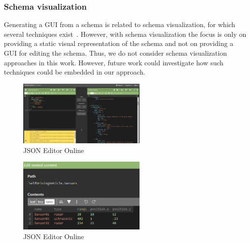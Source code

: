 \subsubsection{Schema visualization}\label{subsubsec:schema-visualization}
Generating a GUI from a schema is related to schema visualization, for which several techniques exist~\cite{Frasincar2006, SILVA201928, 10.1145/1317353.1317362, 1173142}.
However, with schema visualization the focus is only on providing a static visual representation of the schema
and not on providing a GUI for editing the schema.
Thus, we do not consider schema visualization approaches in this work.
However, future work could investigate how such techniques could be embedded in our approach.

\begin{figure}[htb]
    \centering
    \includegraphics[width=2.5in]{figures/jsoneditoronline}
    \caption{JSON Editor Online}
    \label{fig:jsoneditoronline}
\end{figure}
\begin{figure}[htb]
    \centering
    \includegraphics[width=2.5in]{figures/jsoneditoronline-table}
    \caption{JSON Editor Online}
    \label{fig:jsoneditoronline_table}
\end{figure}

%
%
%


